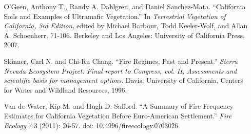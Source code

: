 \begin{hangparas}{.25in}{1}
O'Geen, Anthony T., Randy A. Dahlgren, and Daniel Sanchez-Mata. ``California Soils and Examples of Ultramafic Vegetation.'' In \emph{Terrestrial Vegetation of California, 3rd Edition}, edited by Michael Barbour, Todd Keeler-Wolf, and Allan A. Schoenherr, 71-106. Berkeley and Los Angeles: University of California Press, 2007. 

Skinner, Carl N. and Chi-Ru Chang. ``Fire Regimes, Past and Present.'' \emph{Sierra Nevada Ecosystem Project: Final report to Congress, vol. II, Assessments and scientific basis for management options}. Davis: University of California, Centers for Water and Wildland Resources, 1996.

Van de Water, Kip M. and Hugh D. Safford. ``A Summary of Fire Frequency Estimates for California Vegetation Before Euro-American Settlement.'' \emph{Fire Ecology} 7.3 (2011): 26-57. doi: 10.4996/fireecology.0703026.

\end{hangparas}


